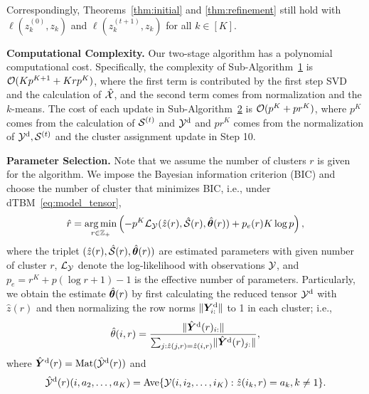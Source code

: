 \documentclass[lettersize,onecolumn,journal]{IEEEtran}
\theoremstyle{definition}
\theoremstyle{definition}
\newcommand{\of}[1]{\left(#1\right)}
\begin{document}
{Correspondingly, Theorems~\ref{thm:initial} and \ref{thm:refinement} still hold with $\ell(z^{(0)}_k, z_k)$ and $\ell(z^{(t+1)}_k, z_k)$  for all $k \in [K]$.

{\bf Computational Complexity.} Our two-stage algorithm has a polynomial computational cost. Specifically, the complexity of Sub-Algorithm~\hyperref[alg:main]{1} is $\mathcal{O}(K p^{K+1} + Krp^K)$, where the first term is contributed by the first step SVD and the calculation of $\hat {\mathcal{X}}$, and the second term comes from normalization and the $k$-means.  The cost of each update in Sub-Algorithm~\hyperref[alg:main]{2} is $\mathcal{O}(p^K + pr^K)$, where $p^K$ comes from the calculation of $\mathcal{S}^{(t)}$ and $\mathcal{Y}^{\text{d}}$ and $pr^K$ comes from the normalization of $\mathcal{Y}^{\text{d}}, \mathcal{S}^{(t)}$ and the cluster assignment update in Step 10.


{\bf Parameter Selection.} Note that we assume the number of clusters $r$ is given for the algorithm. We impose the Bayesian information criterion (BIC)
and choose the number of cluster that minimizes BIC, i.e., under dTBM~\eqref{eq:model_tensor},
\begin{equation}
    \hat r = \argmin_{r \in \mathbb{Z}_+ } \of{ -p^K \tL_{\tY}(\hat z(r), \hat \tS(r), \hat \mtheta(r)) + p_e(r) K \log p},
\end{equation}
where the triplet $(\hat z(r), \hat {\mathcal{S}}(r), \hat {\boldsymbol{\theta}}(r))$ are estimated parameters with given number of cluster $r$, $\mathcal{L}_{\mathcal{Y}}$ denote the log-likelihood with observations $\mathcal{Y}$, and $p_e = r^K + p(\log r + 1) - 1$ is the effective number of parameters. Particularly, we obtain the estimate $\hat {\boldsymbol{\theta}}(r)$ by first calculating the reduced tensor $\mathcal{Y}^{\text{d}}$ with $\hat z(r)$ and then normalizing the row norms $\lVert\bm Y_{i:}^{\text{d}}\rVert$ to 1 in each cluster; i.e., 
\begin{equation}
    \hat \theta(i,r) = \frac{\lVert\hat {\bm Y}^{\text{d}}(r)_{i:}\rVert}{\sum_{j: \hat z(j,r) =  \hat z(i,r)} \lVert\hat {\bm Y}^{\text{d}}(r)_{j:}\rVert},
\end{equation}
where $\hat {\bm Y}^{\text{d}}(r) = \text{Mat}(\hat {\mathcal{Y}}^{\text{d}}(r))$ and 
\begin{equation}
    \hat {\mathcal{Y}}^{\text{d}}(r)(i,a_2,\ldots,a_K) = 
\text{Ave}\{\mathcal{Y}(i,i_2,\ldots,i_K): \hat z(i_k, r) = a_k, k \neq 1 \}.
\end{equation}

}
\end{document}
